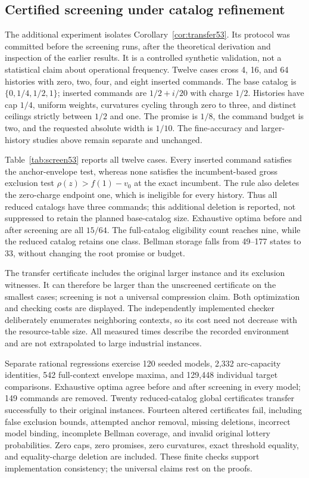 \subsection{Certified screening under catalog refinement}\label{sec:study53}
The additional experiment isolates Corollary~\ref{cor:transfer53}. Its protocol was committed before the screening runs, after the theoretical derivation and inspection of the earlier results. It is a controlled synthetic validation, not a statistical claim about operational frequency. Twelve cases cross 4, 16, and 64 histories with zero, two, four, and eight inserted commands. The base catalog is $\{0,1/4,1/2,1\}$; inserted commands are $1/2+i/20$ with charge $1/2$. Histories have cap $1/4$, uniform weights, curvatures cycling through zero to three, and distinct ceilings strictly between $1/2$ and one. The promise is $1/8$, the command budget is two, and the requested absolute width is $1/10$. The fine-accuracy and larger-history studies above remain separate and unchanged.

Table~\ref{tab:screen53} reports all twelve cases. Every inserted command satisfies the anchor-envelope test, whereas none satisfies the incumbent-based gross exclusion test $\rho(z)>f(1)-v_0$ at the exact incumbent. The rule also deletes the zero-charge endpoint one, which is ineligible for every history. Thus all reduced catalogs have three commands; this additional deletion is reported, not suppressed to retain the planned base-catalog size. Exhaustive optima before and after screening are all $15/64$. The full-catalog eligibility count reaches nine, while the reduced catalog retains one class. Bellman storage falls from 49--177 states to 33, without changing the root promise or budget.

The transfer certificate includes the original larger instance and its exclusion witnesses. It can therefore be larger than the unscreened certificate on the smallest cases; screening is not a universal compression claim. Both optimization and checking costs are displayed. The independently implemented checker deliberately enumerates neighboring contexts, so its cost need not decrease with the resource-table size. All measured times describe the recorded environment and are not extrapolated to large industrial instances.

Separate rational regressions exercise 120 seeded models, 2,332 arc-capacity identities, 542 full-context envelope maxima, and 129,448 individual target comparisons. Exhaustive optima agree before and after screening in every model; 149 commands are removed. Twenty reduced-catalog global certificates transfer successfully to their original instances. Fourteen altered certificates fail, including false exclusion bounds, attempted anchor removal, missing deletions, incorrect model binding, incomplete Bellman coverage, and invalid original lottery probabilities. Zero caps, zero promises, zero curvatures, exact threshold equality, and equality-charge deletion are included. These finite checks support implementation consistency; the universal claims rest on the proofs.
